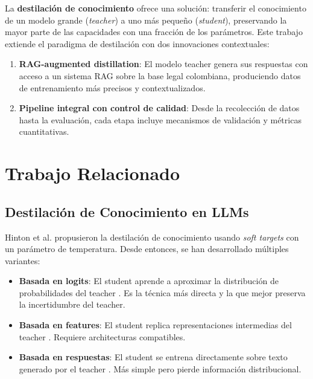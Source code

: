 \documentclass[conference]{IEEEtran}
\begin{document}
La \textbf{destilaci\'on de conocimiento} \cite{hinton2015distilling} ofrece una soluci\'on: transferir el conocimiento de un modelo grande (\textit{teacher}) a uno m\'as peque\~no (\textit{student}), preservando la mayor parte de las capacidades con una fracci\'on de los par\'ametros. Este trabajo extiende el paradigma de destilaci\'on con dos innovaciones contextuales:

\begin{enumerate}
    \item \textbf{RAG-augmented distillation}: El modelo teacher genera sus respuestas con acceso a un sistema RAG sobre la base legal colombiana, produciendo datos de entrenamiento m\'as precisos y contextualizados.
    \item \textbf{Pipeline integral con control de calidad}: Desde la recolecci\'on de datos hasta la evaluaci\'on, cada etapa incluye mecanismos de validaci\'on y m\'etricas cuantitativas.
\end{enumerate}

\section{Trabajo Relacionado}
\label{sec:related}

\subsection{Destilaci\'on de Conocimiento en LLMs}

Hinton et al. \cite{hinton2015distilling} propusieron la destilaci\'on de conocimiento usando \textit{soft targets} con un par\'ametro de temperatura. Desde entonces, se han desarrollado m\'ultiples variantes:

\begin{itemize}
    \item \textbf{Basada en logits}: El student aprende a aproximar la distribuci\'on de probabilidades del teacher \cite{hinton2015distilling, kim2016sequence}. Es la t\'ecnica m\'as directa y la que mejor preserva la incertidumbre del teacher.
    \item \textbf{Basada en features}: El student replica representaciones intermedias del teacher \cite{romero2014fitnets, jiao2020tinybert}. Requiere architecturas compatibles.
    \item \textbf{Basada en respuestas}: El student se entrena directamente sobre texto generado por el teacher \cite{taori2023alpaca}. M\'as simple pero pierde informaci\'on distribucional.
\end{itemize}
\end{document}
